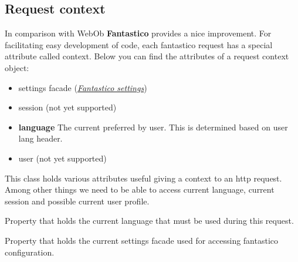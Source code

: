 \documentclass[letterpaper,10pt,english]{sphinxmanual}
\begin{document}
\subsection{Request context}
\label{features/request_response:request-context}
In comparison with WebOb \textbf{Fantastico} provides a nice improvement. For facilitating easy development of code, each fantastico
request has a special attribute called context. Below you can find the attributes of a request context object:
\begin{itemize}
\item {} 
settings facade ({\hyperref[get_started/settings::doc]{\emph{Fantastico settings}}})

\item {} 
session (not yet supported)

\item {} 
\textbf{language} The current preferred by user. This is determined based on user lang header.

\item {} 
user (not yet supported)

\end{itemize}

\begin{fulllineitems}
\label{features/request_response:fantastico.middleware.request_context.RequestContext}
This class holds various attributes useful giving a context to an http request. Among other things we need 
to be able to access current language, current session and possible current user profile.

\begin{fulllineitems}
\label{features/request_response:fantastico.middleware.request_context.RequestContext.language}
Property that holds the current language that must be used during this request.

\end{fulllineitems}


\begin{fulllineitems}
\label{features/request_response:fantastico.middleware.request_context.RequestContext.settings}
Property that holds the current settings facade used for accessing fantastico configuration.

\end{fulllineitems}


\end{fulllineitems}
\end{document}
